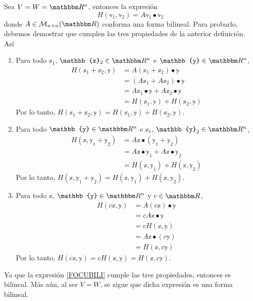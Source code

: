 \begin{example}\label{example:bil_1}
    Sea $V = W = \RR[n]$, entonces la expresión
    \begin{equation}
        H(\mathbb{v}_1, \mathbb{v}_2) = A\mathbb{v}_1 \bullet \mathbb{v}_2 \label{FOCUBILI}
    \end{equation}
    donde $A \in \mathcal{M}_{n \times n}(\RR)$ conforma una forma bilineal. Para probarlo, debemos demostrar que cumplen las tres propiedades de la anterior definición. Así
    \begin{enumerate}[label=\roman*)]
        \item Para todo $\mathbb{x}_1$, $\mathbb{x}_2 \in \RR[n]$ e $\mathbb{y} \in \RR[n]$,
        \begin{align*}
            H(\mathbb{x}_1 + \mathbb{x}_2, \mathbb{y}) & = A(\mathbb{x}_1 + \mathbb{x}_2) \bullet \mathbb{y} \\
            & = (A\mathbb{x}_1 + A\mathbb{x}_2) \bullet \mathbb{y} \\
            & = A\mathbb{x}_1 \bullet \mathbb{y} + A\mathbb{x}_2 \bullet \mathbb{y} \\
            & = H(\mathbb{x}_1, \mathbb{y}) + H(\mathbb{x}_2, \mathbb{y})
        \end{align*}
        Por lo tanto, $H(\mathbb{x}_1 + \mathbb{x}_2, \mathbb{y}) = H(\mathbb{x}_1, \mathbb{y}) + H(\mathbb{x}_2, \mathbb{y})$.
        \item Para todo $\mathbb{y} \in \RR[n]$ e $\mathbb{x}_1$, $\mathbb{y}_2 \in \RR[n]$,
        \begin{align*}
            H(\mathbb{x}, \mathbb{y}_1 + \mathbb{y}_2) & = A\mathbb{x} \bullet (\mathbb{y}_1 + \mathbb{y}_2) \\
            & = A\mathbb{x} \bullet \mathbb{y}_1 + A\mathbb{x} \bullet \mathbb{y}_2 \\
            & = H(\mathbb{x}, \mathbb{y}_1) + H(\mathbb{x}, \mathbb{y}_2)
        \end{align*}
        Por lo tanto, $H(\mathbb{x}, \mathbb{y}_1 + \mathbb{y}_2) = H(\mathbb{x}, \mathbb{y}_1) + H(\mathbb{x}, \mathbb{y}_2)$.
        \item Para todo $\mathbb{x}$, $\mathbb{y} \in \RR[n]$ y $c \in \RR$,
        \begin{align*}
            H(c\mathbb{x}, \mathbb{y}) & = A(c\mathbb{x}) \bullet \mathbb{y} \\
            & = cA\mathbb{x} \bullet \mathbb{y} \\
            & = cH(\mathbb{x}, \mathbb{y}) \\
            & = A\mathbb{x} \bullet (c\mathbb{y}) \\
            & = H(\mathbb{x}, c\mathbb{y})
        \end{align*}
        Por lo tanto, $H(c\mathbb{x}, \mathbb{y}) = cH(\mathbb{x}, \mathbb{y}) = H(\mathbb{x}, c\mathbb{y})$.
    \end{enumerate}
    Ya que la expresión \eqref{FOCUBILI} cumple las tres propiedades, entonces es bilineal. Más aún, al ser $V = W$, se sigue que dicha expresión es una forma bilineal.
\end{example}

